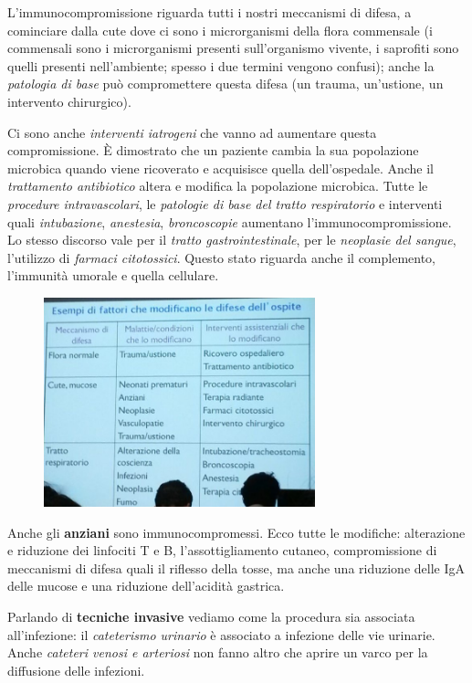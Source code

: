 L'immunocompromissione riguarda tutti i nostri meccanismi di difesa, a
cominciare dalla cute dove ci sono i microrganismi della flora
commensale (i commensali sono i microrganismi presenti sull'organismo
vivente, i saprofiti sono quelli presenti nell'ambiente; spesso i due
termini vengono confusi); anche la \emph{patologia di base} può
compromettere questa difesa (un trauma, un'ustione, un intervento
chirurgico).

Ci sono anche \emph{interventi iatrogeni} che vanno ad aumentare questa
compromissione. È dimostrato che un paziente cambia la sua popolazione
microbica quando viene ricoverato e acquisisce quella dell'ospedale.
Anche il \emph{trattamento antibiotico} altera e modifica la popolazione
microbica. Tutte le \emph{procedure intravascolari}, le \emph{patologie
di base del tratto respiratorio} e interventi quali \emph{intubazione},
\emph{anestesia}, \emph{broncoscopie} aumentano l'immunocompromissione.
Lo stesso discorso vale per il \emph{tratto gastrointestinale}, per le
\emph{neoplasie del sangue}, l'utilizzo di \emph{farmaci citotossici}.
Questo stato riguarda anche il complemento, l'immunità umorale e quella
cellulare.

\begin{figure}[!ht]
\centering
	\includegraphics[width=0.7\textwidth]{19/image1.jpeg}
	\end{figure}

Anche gli \textbf{anziani} sono immunocompromessi. Ecco tutte le
modifiche: alterazione e riduzione dei linfociti T e B,
l'assottigliamento cutaneo, compromissione di meccanismi di difesa quali
il riflesso della tosse, ma anche una riduzione delle IgA delle mucose e
una riduzione dell'acidità gastrica.

Parlando di \textbf{tecniche invasive} vediamo come la procedura sia
associata all'infezione: il \emph{cateterismo urinario} è associato a
infezione delle vie urinarie. Anche \emph{cateteri venosi e arteriosi}
non fanno altro che aprire un varco per la diffusione delle infezioni.

